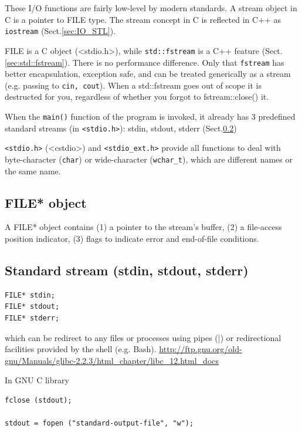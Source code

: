 These I/O functions are fairly low-level by modern standards.
A stream object in C is a pointer to FILE type.
The stream concept in C is reflected in C++ as \verb!iostream!
(Sect.\ref{sec:IO_STL}). 


\begin{mdframed}

FILE is a C object (<stdio.h>), while \verb!std::fstream! is a C++ feature
(Sect.\ref{sec:std::fstream}). There is no performance difference. Only that
\verb!fstream! has better encapsulation, exception safe, and can be treated
generically as a stream (e.g. passing to \verb!cin, cout!). When a std::fstream
goes out of scope it is destructed for you, regardless of whether you forgot to
fstream::close() it.

\end{mdframed}


When the \verb!main()! function of the program is invoked, it already has 3
predefined standard streams (in \verb!<stdio.h>!): stdin, stdout, stderr
(Sect.\ref{sec:standard_stream})

\verb!<stdio.h>! (<cstdio>) and \verb!<stdio_ext.h>! provide all functions to
deal with byte-character (\verb!char!) or wide-character (\verb!wchar_t!), which
are different names or the same name.

\subsection{FILE* object}
\label{sec:FILE}

A FILE* object contains (1) a pointer to the stream's buffer, (2) a file-access
position indicator, (3) flags to indicate error and end-of-file conditions. 


\subsection{Standard stream (stdin, stdout, stderr)}
\label{sec:standard_stream}

\begin{verbatim}
FILE* stdin;
FILE* stdout;
FILE* stderr;
\end{verbatim}
which can be redirect to any files or processes using pipes (|) or redirectional
facilities provided by the shell (e.g. Bash).
\url{http://ftp.gnu.org/old-gnu/Manuals/glibc-2.2.3/html_chapter/libc_12.html_docs}

In GNU C library
\begin{lstlisting}
fclose (stdout);

stdout = fopen ("standard-output-file", "w");
\end{lstlisting}



